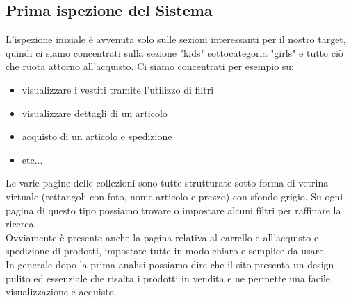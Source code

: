 \documentclass[12pt,a4paper]{report}
\begin{document}
\subsection{Prima ispezione del Sistema}
L'ispezione iniziale è avvenuta solo sulle sezioni interessanti per il nostro target, quindi ci siamo concentrati sulla sezione "kids" sottocategoria "girls" e tutto ciò che ruota attorno all'acquisto.
Ci siamo concentrati per esempio su:
\begin{itemize}
  \item visualizzare i vestiti tramite l'utilizzo di filtri
  \item visualizzare dettagli di un articolo
  \item acquisto di un articolo e spedizione
  \item etc...
\end{itemize}
Le varie pagine delle collezioni sono tutte strutturate sotto forma di vetrina virtuale (rettangoli con foto, nome articolo e prezzo) con sfondo grigio. Su ogni pagina di questo tipo possiamo trovare o impostare alcuni filtri per raffinare la ricerca.\\
Ovviamente è presente anche la pagina relativa al carrello e all'acquisto e spedizione di prodotti, impostate tutte in modo chiaro e semplice da usare.\\
In generale dopo la prima analisi possiamo dire che il sito presenta un design pulito ed essenziale che risalta i prodotti in vendita e ne permette una facile visualizzazione e acquisto.
\end{document}
